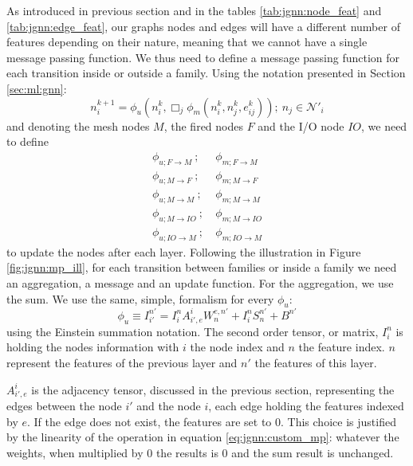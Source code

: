 \documentclass[../main.tex]{subfiles}
\begin{document}
As introduced in previous section and in the tables \ref{tab:jgnn:node_feat} and \ref{tab:jgnn:edge_feat}, our graphs nodes and edges will have a different number of features depending on their nature, meaning that we cannot have a single message passing function. We thus need to define a message passing function for each transition inside or outside a family. Using the notation presented in Section \ref{sec:ml:gnn}:
\begin{equation}
  \label{eq:jgnn:gen_mp}
  n_i^{k+1} = \phi_u (n_i^k, \Box_j \phi_m(n_i^k, n_j^k, e^k_{ij})); ~ n_j \in \mathcal{N}'_i
\end{equation}
and denoting the mesh nodes $M$, the fired nodes $F$ and the I/O node $IO$, we need to define
\begin{align*}
  \phi_{u; F\rightarrow M}  ~;~ &\phi_{m; F\rightarrow M} \\
  \phi_{u; M\rightarrow F}  ~;~ &\phi_{m; M\rightarrow F} \\
  \phi_{u; M\rightarrow M}  ~;~ &\phi_{m; M\rightarrow M} \\
  \phi_{u; M\rightarrow IO} ~;~ &\phi_{m; M\rightarrow IO} \\
  \phi_{u; IO\rightarrow M} ~;~ &\phi_{m; IO\rightarrow M}
\end{align*}
to update the nodes after each layer. Following the illustration in Figure \ref{fig:jgnn:mp_ill}, for each transition between families or inside a family we need an aggregation, a message and an update function. For the aggregation, we use the sum. We use the same, simple, formalism for every $\phi_u$:
\begin{equation}
  \label{eq:jgnn:custom_mp}
  \phi_u \equiv I^{n'}_{i'} = I^n_i A_{i',e}^{i} W_n^{e,n'} + I^n_i S^{n'}_{n} + B^{n'}
\end{equation}
using the Einstein summation notation. The second order tensor, or matrix, $I^{n}_i$ is holding the nodes information with $i$ the node index and $n$ the feature index. $n$ represent the features of the previous layer and $n'$ the features of this layer.

$A_{i',e}^{i}$ is the adjacency tensor, discussed in the previous section, representing the edges between the node $i'$ and the node $i$, each edge holding the features indexed by $e$. If the edge does not exist, the features are set to 0. This choice is justified by the linearity of the operation in equation \ref{eq:jgnn:custom_mp}: whatever the weights, when multiplied by 0 the results is 0 and the sum result is unchanged.
\end{document}
